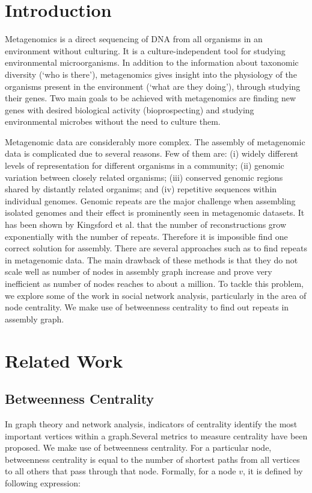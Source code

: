 \documentclass[runningheads,a4paper]{llncs}
\begin{document}
\section{Introduction}

Metagenomics is a direct sequencing of DNA from all organisms in an environment without culturing.  It is a culture-independent tool for studying environmental microorganisms. In addition to the information about taxonomic diversity (‘who is there’), metagenomics gives insight into the physiology of the organisms present in the environment (‘what are they doing’), through studying their genes. Two main goals to be achieved with metagenomics are finding new genes with desired biological activity (bioprospecting) and studying environmental microbes without the need to culture them.

Metagenomic data are considerably more complex. The assembly of metagenomic data is complicated due to several reasons. Few of them are: (i) widely different levels of representation for different organisms in a community; (ii) genomic variation between closely related organisms; (iii) conserved genomic regions shared by distantly related organims; and (iv) repetitive sequences within individual genomes. Genomic repeats are the major challenge when assembling isolated genomes and their effect is prominently seen in metagenomic datasets. It has been shown by Kingsford et al.\cite{kingsford} that the number of reconstructions grow exponentially with the number of repeats. Therefore it is impossible find one correct solution for assembly. There are several approaches such as \cite{bambus} to find repeats in metagenomic data. The main drawback of these methods is that they do not scale well as number of nodes in assembly graph increase and prove very inefficient as number of nodes reaches to about a million. To tackle this problem, we explore some of the work in social network analysis, particularly in the area of node centrality. We make use of betweenness centrality to find out repeats in assembly graph. 

\section{Related Work}

\subsection*{Betweenness Centrality}
In graph theory and network analysis, indicators of centrality identify the most important vertices within a graph.Several metrics to measure centrality have been proposed. We make use of betweenness centrality. For a particular node, betweenness centrality is equal to the number of shortest paths from all vertices to all others that pass through that node. Formally, for a node $v$, it is defined by following expression:
\end{document}
